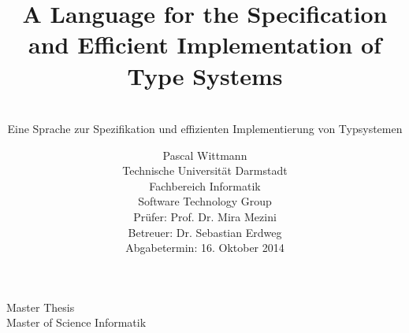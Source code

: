\begin{center}
  Master Thesis \\
  Master of Science Informatik
\end{center}

\title{A Language for the Specification and Efficient Implementation
  of Type Systems}
\subtitle{\hline\\[.5cm]Eine Sprache zur Spezifikation und effizienten
  Implementierung von Typsystemen}
\author{
Pascal Wittmann \\[6cm]
\small Technische Universität Darmstadt \\
\small Fachbereich Informatik \\
\small Software Technology Group \\[0.5cm]
\small Prüfer: Prof. Dr. Mira Mezini \\
\small Betreuer: Dr. Sebastian Erdweg \\[0.5cm]
\small Abgabetermin: 16. Oktober 2014
}
\date{} %

\begingroup\ 
\let\newpage\relax %
\maketitle
\endgroup

\clearpage
\thispagestyle{empty}
\mbox{}

